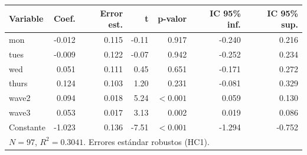 
\begin{tabular}{lrrrrrr}
\toprule
Variable & Coef. & Error est. & t & p-valor & IC 95\% inf. & IC 95\% sup.\\
\midrule
mon & -0.012 & 0.115 & -0.11 & 0.917 & -0.240 & 0.216\\
tues & -0.009 & 0.122 & -0.07 & 0.942 & -0.252 & 0.234\\
wed & 0.051 & 0.111 & 0.45 & 0.651 & -0.171 & 0.272\\
thurs & 0.124 & 0.103 & 1.20 & 0.231 & -0.081 & 0.329\\
wave2 & 0.094 & 0.018 & 5.24 & $<0.001$ & 0.059 & 0.130\\
wave3 & 0.053 & 0.017 & 3.13 & 0.002 & 0.019 & 0.086\\
Constante & -1.023 & 0.136 & -7.51 & $<0.001$ & -1.294 & -0.752\\
\midrule
\multicolumn{7}{l}{$N=97$, $R^2=0.3041$. Errores estándar robustos (HC1).}\\
\bottomrule
\end{tabular}
